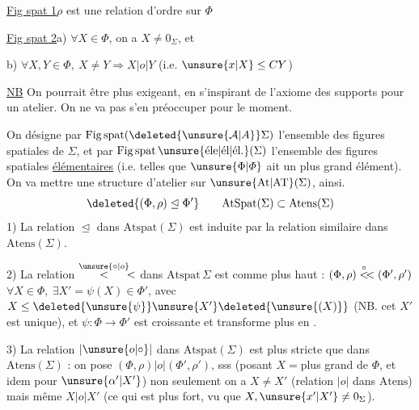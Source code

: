 \uline{Fig spat 1}\quad $\rho$ est une relation d'ordre sur $\Phi$

\uline{Fig spat 2}\quad a) $\forall X\in\Phi$, on a $X\ne0_\Sigma$, et

\hspace*{4em}b) $\forall X,Y\in\Phi,\ X\ne Y\Longrightarrow X\mathrel{|o|}Y$ (i.e. $\unsure{x|X}\leq CY$)

\uline{NB} On pourrait être plus exigeant, en s'inspirant de l'axiome des supports pour un atelier. On ne va pas s'en préoccuper pour le moment.

On désigne par $\mathrm{Fig}\,\mathrm{spat}(\deleted{\unsure{\mathcal A|A}}\Sigma)$ l'ensemble des figures spatiales de $\Sigma$, et par
$\mathrm{Fig}\,\mathrm{spat}\,\text{\unsure{éle|él|él.}}(\Sigma)$ l'ensemble des figures spatiales \uline{élémentaires} (i.e. telles que $\unsure{\Phi|\varPhi}$ ait un plus grand élément). On va mettre une structure d'atelier sur $\unsure{\mathrm{At}|\mathrm{AT}}(\Sigma)$, ainsi.
\[
\deleted{(\Phi,\rho)\trianglelefteq\Phi'}\qquad
\mathrm{AtSpat}(\Sigma)\subset\mathrm{Atens}(\Sigma)
\]
1) La relation $\trianglelefteq$ dans $\mathrm{Atspat}(\Sigma)$ est induite par la relation similaire dans $\mathrm{Atens}(\Sigma)$.

2) La relation $\mathrel{\overset{\unsure{\circ|o}}{<}\mkern-4mu<}$ dans $\mathrm{Atspat}\,\Sigma$ est  comme plus haut : $(\Phi,\rho)\mathrel{\overset{\circ}{<}\mkern-4mu<}(\Phi',\rho')$   $\forall X\in\Phi,\ \exists X'=\psi(X)\in\Phi'$, avec $X\leq\deleted{\unsure{\psi}} \unsure{X'}\deleted{\unsure{(X)}}$ (NB.  cet $X'$ est unique), et $\psi:\Phi\longrightarrow\Phi'$ est croissante  et transforme plus   en .

3) La relation $\mathrel{|\unsure{o|\circ}|}$ dans $\mathrm{Atspat}(\Sigma)$ est  plus stricte que dans $\mathrm{Atens}(\Sigma)$ : on pose $(\Phi,\rho)\mathrel{|o|}(\Phi',\rho')$, sss (posant $X={}$plus grand  de $\Phi$, et idem pour $\unsure{\alpha'|X'}$) non seulement on a $X\ne X'$ (relation $\mathrel{|o|}$ dans $\mathrm{Atens}$) mais même $X\mathrel{|o|}X'$ (ce qui est plus fort, vu que $X,\unsure{x'|X'}\ne0_\Sigma$).

